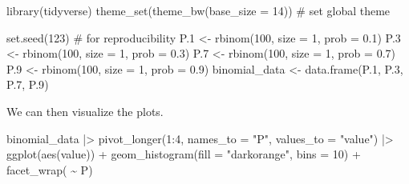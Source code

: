 \documentclass[
  letterpaper,
  DIV=11,
  numbers=noendperiod]{scrreprt}
\newenvironment{Shaded}{\begin{snugshade}}{\end{snugshade}}
\newcommand{\AttributeTok}[1]{\textcolor[rgb]{0.40,0.45,0.13}{#1}}
\newcommand{\CommentTok}[1]{\textcolor[rgb]{0.37,0.37,0.37}{#1}}
\newcommand{\DecValTok}[1]{\textcolor[rgb]{0.68,0.00,0.00}{#1}}
\newcommand{\FloatTok}[1]{\textcolor[rgb]{0.68,0.00,0.00}{#1}}
\newcommand{\FunctionTok}[1]{\textcolor[rgb]{0.28,0.35,0.67}{#1}}
\newcommand{\NormalTok}[1]{\textcolor[rgb]{0.00,0.23,0.31}{#1}}
\newcommand{\OtherTok}[1]{\textcolor[rgb]{0.00,0.23,0.31}{#1}}
\newcommand{\SpecialCharTok}[1]{\textcolor[rgb]{0.37,0.37,0.37}{#1}}
\newcommand{\StringTok}[1]{\textcolor[rgb]{0.13,0.47,0.30}{#1}}
\begin{document}
\begin{Shaded}
\begin{Highlighting}[]
\FunctionTok{library}\NormalTok{(tidyverse)}
\FunctionTok{theme\_set}\NormalTok{(}\FunctionTok{theme\_bw}\NormalTok{(}\AttributeTok{base\_size =} \DecValTok{14}\NormalTok{)) }\CommentTok{\# set global theme}

\FunctionTok{set.seed}\NormalTok{(}\DecValTok{123}\NormalTok{) }\CommentTok{\# for reproducibility}
\NormalTok{P}\FloatTok{.1} \OtherTok{\textless{}{-}} \FunctionTok{rbinom}\NormalTok{(}\DecValTok{100}\NormalTok{, }\AttributeTok{size =} \DecValTok{1}\NormalTok{, }\AttributeTok{prob =} \FloatTok{0.1}\NormalTok{)}
\NormalTok{P}\FloatTok{.3} \OtherTok{\textless{}{-}} \FunctionTok{rbinom}\NormalTok{(}\DecValTok{100}\NormalTok{, }\AttributeTok{size =} \DecValTok{1}\NormalTok{, }\AttributeTok{prob =} \FloatTok{0.3}\NormalTok{)}
\NormalTok{P}\FloatTok{.7} \OtherTok{\textless{}{-}} \FunctionTok{rbinom}\NormalTok{(}\DecValTok{100}\NormalTok{, }\AttributeTok{size =} \DecValTok{1}\NormalTok{, }\AttributeTok{prob =} \FloatTok{0.7}\NormalTok{)}
\NormalTok{P}\FloatTok{.9} \OtherTok{\textless{}{-}} \FunctionTok{rbinom}\NormalTok{(}\DecValTok{100}\NormalTok{, }\AttributeTok{size =} \DecValTok{1}\NormalTok{, }\AttributeTok{prob =} \FloatTok{0.9}\NormalTok{)}
\NormalTok{binomial\_data }\OtherTok{\textless{}{-}} \FunctionTok{data.frame}\NormalTok{(P}\FloatTok{.1}\NormalTok{, P}\FloatTok{.3}\NormalTok{, P}\FloatTok{.7}\NormalTok{, P}\FloatTok{.9}\NormalTok{)}
\end{Highlighting}
\end{Shaded}

We can then visualize the plots.

\begin{Shaded}
\begin{Highlighting}[]
\NormalTok{binomial\_data }\SpecialCharTok{|\textgreater{}}
  \FunctionTok{pivot\_longer}\NormalTok{(}\DecValTok{1}\SpecialCharTok{:}\DecValTok{4}\NormalTok{, }\AttributeTok{names\_to =} \StringTok{"P"}\NormalTok{,}
               \AttributeTok{values\_to =} \StringTok{"value"}\NormalTok{) }\SpecialCharTok{|\textgreater{}}
  \FunctionTok{ggplot}\NormalTok{(}\FunctionTok{aes}\NormalTok{(value)) }\SpecialCharTok{+}
  \FunctionTok{geom\_histogram}\NormalTok{(}\AttributeTok{fill =} \StringTok{"darkorange"}\NormalTok{,}
                 \AttributeTok{bins =} \DecValTok{10}\NormalTok{) }\SpecialCharTok{+}
  \FunctionTok{facet\_wrap}\NormalTok{( }\SpecialCharTok{\textasciitilde{}}\NormalTok{ P) }
\end{Highlighting}
\end{Shaded}
\end{document}

